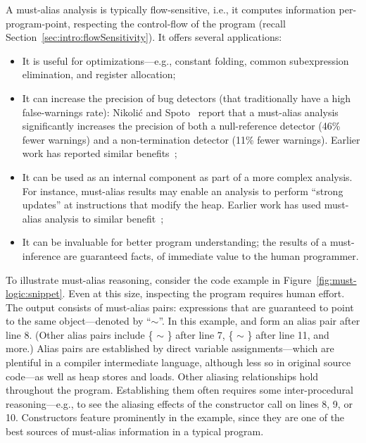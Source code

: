 A must-alias analysis is typically flow-sensitive, i.e., it computes information per-program-point, respecting the control-flow of the program (recall Section~\ref{sec:intro:flowSensitivity}). It offers several applications:

\begin{itemize}
\item It is useful for optimizations---e.g., constant folding, common subexpression elimination, and register allocation;

\item It can increase the precision of bug detectors (that traditionally have a high false-warnings rate): Nikoli\'{c} and Spoto~\cite{ictac:2012:Nikolic} report that a must-alias analysis significantly increases the precision of both a null-reference detector (46\% fewer warnings) and a non-termination detector (11\% fewer warnings). Earlier work has reported similar benefits~\cite{isola:2008:Ma};

\item It can be used as an internal component as part of a more complex analysis. For instance, must-alias results may enable an analysis to perform ``strong updates'' at instructions that modify the heap. Earlier work has used must-alias analysis to similar benefit~\cite{pldi:1994:Emami,popl:1998:Jagannathan};

\item It can be invaluable for better program understanding; the results of a must-inference are guaranteed facts, of immediate value to the human programmer.
\end{itemize}

To illustrate must-alias reasoning, consider the code example in Figure~\ref{fig:must-logic:snippet}. Even at this size, inspecting the program requires human effort. The output consists of must-alias pairs: expressions that are guaranteed to point to the same object---denoted by ``$\sim$''. In this example,  and  form an alias pair after line 8. (Other alias pairs include \{ $\sim$ \} after line 7, \{ $\sim$ \} after line 11, and more.) Alias pairs are established by direct variable assignments---which are plentiful in a compiler intermediate language, although less so in original source code---as well as heap stores and loads. Other aliasing relationships hold throughout the program. Establishing them often requires some inter-procedural reasoning---e.g., to see the aliasing effects of the constructor call on lines 8, 9, or 10. Constructors feature prominently in the example, since they are one of the best sources of must-alias information in a typical program.

